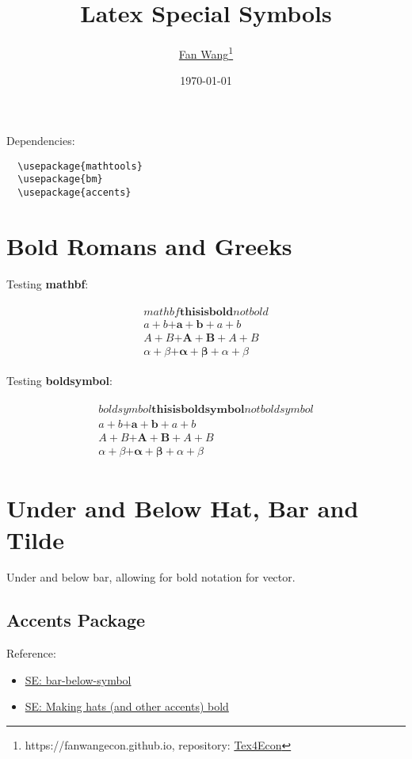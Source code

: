 \documentclass[12pt,english]{article}
\title{Latex Special Symbols}
\author{\href{https://fanwangecon.github.io/}{Fan Wang}\thanks{https://fanwangecon.github.io, repository: \href{https://fanwangecon.github.io/Tex4Econ/}{Tex4Econ}}}
\date{\today}
\begin{document}
\maketitle

Dependencies:
\begin{verbatim}
  \usepackage{mathtools}
  \usepackage{bm}
  \usepackage{accents}
\end{verbatim}

\section{Bold Romans and Greeks}

Testing \textbf{mathbf}:

\begin{align}
  \begin{gathered}
    mathbf\mathbf{this is bold} not bold\\
    a + b \mathbf{+ a + b} + a + b\\
    A + B \mathbf{+ A + B} + A + B\\
    \alpha + \beta \mathbf{+ \alpha + \beta} + \alpha + \beta
  \end{gathered}
\end{align}

Testing \textbf{boldsymbol}:

\begin{align}
  \begin{gathered}
    boldsymbol\boldsymbol{this is boldsymbol} not boldsymbol\\
    a + b \boldsymbol{+ a + b} + a + b\\
    A + B \boldsymbol{+ A + B} + A + B\\
    \alpha + \beta \boldsymbol{+ \alpha + \beta} + \alpha + \beta
  \end{gathered}
\end{align}

\section{Under and Below Hat, Bar and Tilde}

Under and below bar, allowing for bold notation for vector.

\subsection{Accents Package}

Reference:
\begin{itemize}
  \item \href{https://tex.stackexchange.com/questions/125412/bar-below-symbol}{SE: bar-below-symbol}
  \item \href{https://tex.stackexchange.com/questions/66537/making-hats-and-other-accents-bold}{SE: Making hats (and other accents) bold}
\end{itemize}
\end{document}
